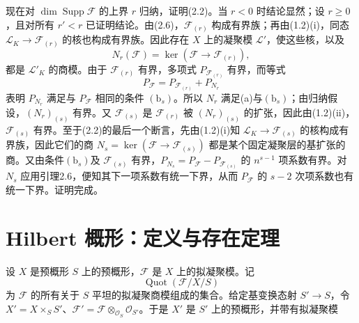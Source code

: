 现在对 $\dim\operatorname{Supp}\mathcal F$ 的上界 $r$ 归纳，证明(2.2)。当 $r<0$ 时结论显然；设 $r\geq0$，且对所有 $r'<r$ 已证明结论。由(2.6)，$\mathcal F_{(r)}$ 构成有界族；再由(1.2)(i)，同态 $\mathcal L_K\to\mathcal F_{(r)}$ 的核也构成有界族。因此存在 $X$ 上的凝聚模 $\mathcal L'$，使这些核，以及
\[
N_r(\mathcal F)=\ker(\mathcal F\to\mathcal F_{(r)}),
\]
都是 $\mathcal L'_K$ 的商模。由于 $\mathcal F_{(r)}$ 有界，多项式 $P_{\mathcal F_{(r)}}$ 有界，而等式
\[
P_{\mathcal F}=P_{\mathcal F_{(r)}}+P_{N_r}
\]
表明 $P_{N_r}$ 满足与 $P_{\mathcal F}$ 相同的条件 $(\mathrm b_s)$。所以 $N_r$ 满足(a)与$(\mathrm b_s)$；由归纳假设，$(N_r)_{(s)}$ 有界。又 $\mathcal F_{(s)}$ 是 $\mathcal F_{(r)}$ 被 $(N_r)_{(s)}$ 的扩张，因此由(1.2)(ii)，$\mathcal F_{(s)}$ 有界。至于(2.2)的最后一个断言，先由(1.2)(i)知 $\mathcal L_K\to\mathcal F_{(s)}$ 的核构成有界族，因此它们的商 $N_s=\ker(\mathcal F\to\mathcal F_{(s)})$ 都是某个固定凝聚层的基扩张的商。又由条件$(\mathrm b_s)$及 $\mathcal F_{(s)}$ 有界，$P_{N_s}=P_{\mathcal F}-P_{\mathcal F_{(s)}}$ 的 $n^{s-1}$ 项系数有界。对 $N_s$ 应用引理2.6，便知其下一项系数有统一下界，从而 $P_{\mathcal F}$ 的 $s-2$ 次项系数也有统一下界。证明完成。

\section{Hilbert 概形：定义与存在定理}
设 $X$ 是预概形 $S$ 上的预概形，$\mathcal F$ 是 $X$ 上的拟凝聚模。记
\[
\operatorname{Quot}(\mathcal F/X/S)
\]
为 $\mathcal F$ 的所有关于 $S$ 平坦的拟凝聚商模组成的集合。给定基变换态射 $S'\to S$，令 $X'=X\times_SS'$、$\mathcal F'=\mathcal F\otimes_{\mathcal O_S}\mathcal O_{S'}$。于是 $X'$ 是 $S'$ 上的预概形，并带有拟凝聚模

